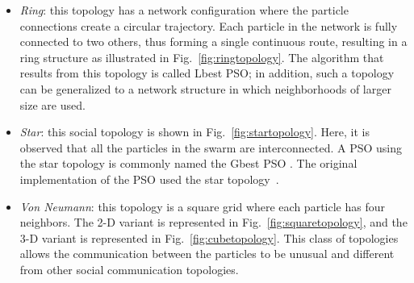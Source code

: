 \begin{itemize}
    \item \textit{Ring}:
      this topology has a network configuration where the particle connections create a circular trajectory. Each particle in the network is fully connected to two others, thus forming a single continuous route, resulting in a ring structure as illustrated in Fig.~\ref{fig:ringtopology}. The algorithm that results from this topology is called Lbest PSO; in addition, such a topology can be generalized to a network structure in which neighborhoods of larger size are used.
    \item \textit{Star}:
    this social topology is shown in Fig.~\ref{fig:startopology}. Here, it is observed that all the particles in the swarm are interconnected. A PSO using the star topology is commonly named the Gbest PSO . The original implementation of the PSO used the star topology~\cite{kennedy1995particle}.
    \item \textit{Von Neumann}:
    this topology is a square grid where each particle has four neighbors. The 2-D variant is represented in Fig.~\ref{fig:squaretopology}, and the 3-D variant is represented in Fig.~\ref{fig:cubetopology}. This class of topologies allows the communication between the particles to be unusual and different from other social communication topologies.
\end{itemize}

